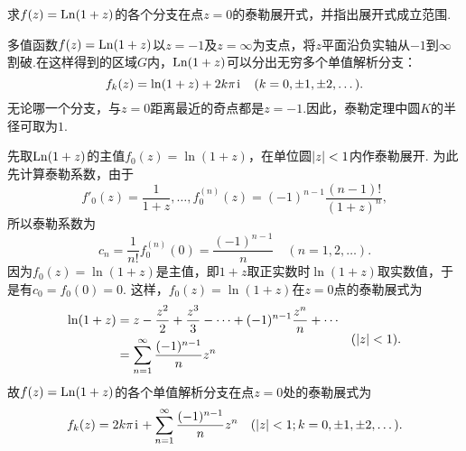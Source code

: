 \begin{example}
求\(f(z) = \operatorname{Ln}(1+z)\)的各个分支在点\(z = 0\)的泰勒展开式，并指出展开式成立范围.
\begin{solution}
多值函数\(f(z) = \operatorname{Ln}(1+z)\)以\(z = -1\)及\(z = \infty\)为支点，将\(z\)平面沿负实轴从\(-1\)到\(\infty\)割破.在这样得到的区域\(G\)内，\(\operatorname{Ln}(1+z)\)可以分出无穷多个单值解析分支：\[
f_k(z) = \ln(1+z) + 2k\pi\kern1pt\mathrm{i}\kern1pt
\quad(k=0,\pm1,\pm2,\dotsc).
\]无论哪一个分支，与\(z = 0\)距离最近的奇点都是\(z = -1\).因此，泰勒定理中圆\(K\)的半径可取为\(1\).

先取\(\operatorname{Ln}(1+z)\)的主值\(f_0(z) = \ln(1+z)\)，在单位圆\(\abs{z}<1\)内作泰勒展开.
为此先计算泰勒系数，由于\[
f'_0(z) = \frac{1}{1+z},
\dotsc,
f^{(n)}_0(z) = (-1)^{n-1} \frac{(n-1)!}{(1+z)^n},
\]所以泰勒系数为\[
c_n = \frac{1}{n!} f^{(n)}_0(0) = \frac{(-1)^{n-1}}{n}
\quad (n=1,2,\dotsc).
\]因为\(f_0(z) = \ln(1+z)\)是主值，即\(1+z\)取正实数时\(\ln(1+z)\)取实数值，于是有\(c_0 = f_0(0) = 0\).
这样，\(f_0(z) = \ln(1+z)\)在\(z = 0\)点的泰勒展式为\begin{equation}\label{equation:解析函数的级数表示.对数函数的泰勒展式}
\begin{split}
\ln(1+z) &= z - \frac{z^2}{2} + \frac{z^3}{3} - \dotsb + (-1)^{n-1} \frac{z^n}{n} + \dotsb \\
&= \sum\limits_{n=1}^\infty \frac{(-1)^{n-1}}{n} z^n
\end{split}
\quad (\abs{z} < 1).
\end{equation}故\(f(z) = \operatorname{Ln}(1+z)\)的各个单值解析分支在点\(z = 0\)处的泰勒展式为\[
f_k(z) = 2k\pi\kern1pt\mathrm{i}\kern1pt + \sum\limits_{n=1}^\infty \frac{(-1)^{n-1}}{n} z^n
\quad (\abs{z} < 1; k=0,\pm1,\pm2,\dotsc).
\]
\end{solution}
\end{example}

